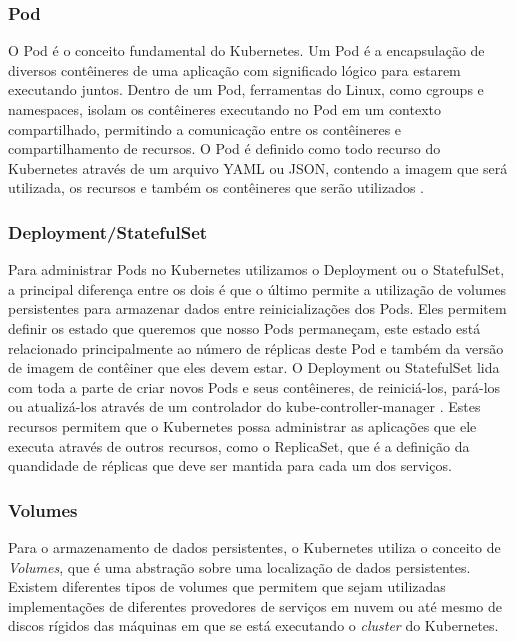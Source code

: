 \subsubsection{Pod}

O Pod é o conceito fundamental do Kubernetes. Um Pod é a encapsulação de
diversos contêineres de uma aplicação com significado lógico para estarem
executando juntos. Dentro de um Pod, ferramentas do Linux, como cgroups e
namespaces, isolam os contêineres executando no Pod em um contexto
compartilhado, permitindo a comunicação entre os contêineres e compartilhamento
de recursos. O Pod é definido como todo recurso do Kubernetes através de um
arquivo YAML ou JSON, contendo a imagem que será utilizada, os recursos e
também os contêineres que serão utilizados \cite{kubernetes:pod}.

\subsubsection{Deployment/StatefulSet}

Para administrar Pods no Kubernetes utilizamos o Deployment ou o StatefulSet,
a principal diferença entre os dois é que o último permite a utilização de
volumes persistentes para armazenar dados entre reinicializações dos Pods.
Eles permitem definir os estado que queremos que nosso Pods permaneçam, este
estado está relacionado principalmente ao número de réplicas deste Pod e
também da versão de imagem de contêiner que eles devem estar. O Deployment
ou StatefulSet lida com toda a parte de criar novos Pods e seus contêineres,
de reiniciá-los, pará-los ou atualizá-los através de um controlador do
kube-controller-manager \cite{kubernetes:deployment}. Estes recursos permitem
que o Kubernetes possa administrar as aplicações que ele executa através de
outros recursos, como o ReplicaSet, que é a definição da quandidade de réplicas
que deve ser mantida para cada um dos serviços.

\subsubsection{Volumes}

Para o armazenamento de dados persistentes, o Kubernetes utiliza o conceito
de \textit{Volumes}, que é uma abstração sobre uma localização de dados
persistentes. Existem diferentes tipos de volumes que permitem que sejam
utilizadas implementações de diferentes provedores de serviços em nuvem ou
até mesmo de discos rígidos das máquinas em que se está executando o
\textit{cluster} do Kubernetes. \cite{kubernetes:volumes}

